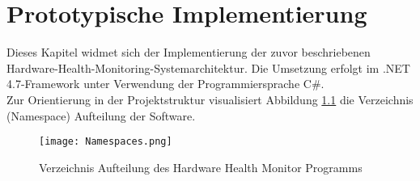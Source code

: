 \newpage
\chapter{Prototypische Implementierung}
Dieses Kapitel widmet sich der Implementierung der zuvor beschriebenen Hardware-Health-Monitoring-Systemarchitektur. Die Umsetzung erfolgt im .NET 4.7-Framework unter Verwendung der Programmiersprache C\#.\\
Zur Orientierung in der Projektstruktur visualisiert Abbildung \ref{fig:Namespaces} die Verzeichnis (Namespace) Aufteilung der Software.  
\begin{center}
    \begin{figure}[h!]
        \captionsetup{justification=centering,format=plain, font=small}
        \centering
        \texttt{[image: Namespaces.png]}
        \caption{Verzeichnis Aufteilung des Hardware Health Monitor Programms}
        \label{fig:Namespaces}
    \end{figure}
\end{center}
